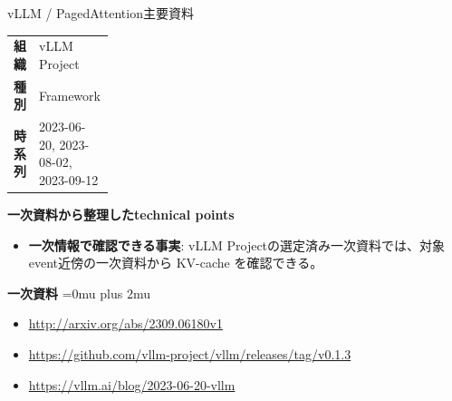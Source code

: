 \begin{technicalnote}{vLLM / PagedAttention}{主要資料}
\begingroup
\begin{tabularx}{\linewidth}{@{}>{\bfseries}p{0.22\linewidth}X@{}}
組織 & vLLM Project \\
種別 & Framework \\
時系列 & 2023-06-20, 2023-08-02, 2023-09-12 \\
\end{tabularx}
\smallskip
{\bfseries 一次資料から整理したtechnical points}
\begin{itemize}[leftmargin=1.5em,itemsep=0.35em]
\item \textbf{一次情報で確認できる事実}: vLLM Projectの選定済み一次資料では、対象event近傍の一次資料から KV-cache を確認できる。
\end{itemize}
\begin{minipage}{\linewidth}
\begin{samepage}
{\bfseries 一次資料}
\begingroup\sloppy
\Urlmuskip=0mu plus 2mu\relax
\begin{itemize}[leftmargin=1.5em,itemsep=0.25em]
\item {\scriptsize\url{http://arxiv.org/abs/2309.06180v1}}
\item {\scriptsize\url{https://github.com/vllm-project/vllm/releases/tag/v0.1.3}}
\item {\scriptsize\url{https://vllm.ai/blog/2023-06-20-vllm}}
\end{itemize}
\endgroup
\end{samepage}
\end{minipage}
\endgroup
\end{technicalnote}
\medskip

